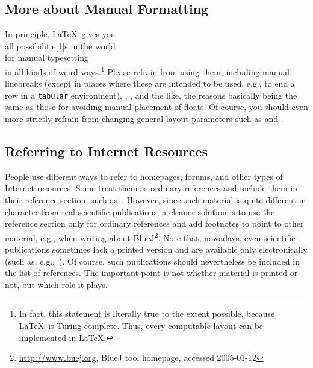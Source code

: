 \documentclass[runningheads,a4paper,oribibl]{llncs}
\begin{document}
\subsection{More about Manual Formatting}
In principle, \LaTeX\ gives you\\
\hspace*{-2em}all p\raisebox{1pt}os\hspace{.2ex}si\raisebox{-.5ex}bi\hspace{-.5ex}litie\scalebox{5}[1]s in the world\\[.5ex]
\hspace*{2em}for manual typesetting\\[-1.5ex]
\hspace*{2cm} in all kinds of weird ways.\footnote{In fact, this statement
is literally true to the extent possible, because \LaTeX\ 
is Turing complete. Thus, every computable layout can be implemented in \LaTeX.} Please refrain
from using them, including manual
linebreaks (except in places where these are intended to be used, e.g., to
end a row in a \texttt{tabular} environment), \texttt{\string\noindent}, \texttt{\string\bigskip},
and the like, the reasons basically being the same as those for avoiding manual placement
of floats. Of course, you should even more strictly refrain from changing general layout parameters such
as \texttt{\string\parskip} and \texttt{\string\parindent}.

\subsection{Referring to Internet Resources}

People use different ways to refer to homepages, forums, and other types of Internet resources.
Some treat them as ordinary references and include them in their reference section, such
as~\cite{bluej}. However, since such material is quite different in character from real scientific
publications, a cleaner solution is to use the reference section only for ordinary references and
add footnotes to point to other material, e.g., when writing about BlueJ\footnote{\url{http://www.buej.org},
BlueJ tool homepage, accessed 2005-01-12}. Note that, nowadays, even scientific publications
sometimes lack a printed version and are available only electronically (such as,
e.g.,~\cite{Corradini-Drewes:11}). Of course, such publications
should nevertheless be included in the list of references. The important point is not whether
material is printed or not, but which role it plays.
\end{document}
